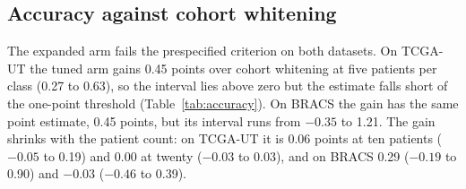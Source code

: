 \subsection{Accuracy against cohort whitening}
\label{sec:accuracy-results}
The expanded arm fails the prespecified criterion on both datasets. On TCGA-UT the tuned arm gains 0.45 points over cohort whitening at five patients per class (0.27 to 0.63), so the interval lies above zero but the estimate falls short of the one-point threshold (Table~\ref{tab:accuracy}). On BRACS the gain has the same point estimate, 0.45 points, but its interval runs from $-0.35$ to 1.21. The gain shrinks with the patient count: on TCGA-UT it is 0.06 points at ten patients ($-0.05$ to 0.19) and 0.00 at twenty ($-0.03$ to 0.03), and on BRACS 0.29 ($-0.19$ to 0.90) and $-0.03$ ($-0.46$ to 0.39).

